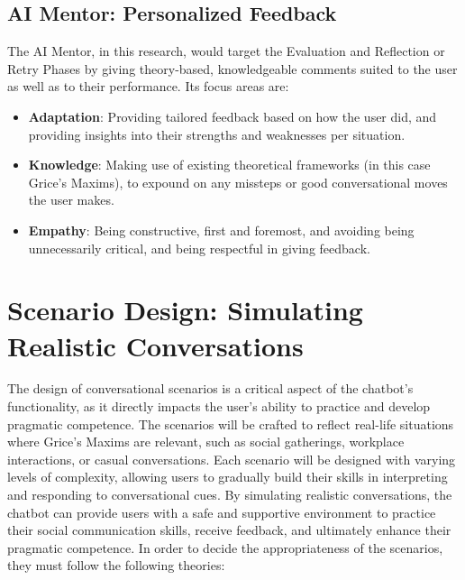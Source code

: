 \subsection{AI Mentor: Personalized Feedback}

The AI Mentor, in this research, would target the Evaluation and Reflection or Retry Phases by giving theory-based, knowledgeable comments suited to the user as well as to their performance. Its focus areas are:

\begin{itemize}
    \item \textbf{Adaptation}: Providing tailored feedback based on how the user did, and providing insights into their strengths and weaknesses per situation.
    \item \textbf{Knowledge}: Making use of existing theoretical frameworks (in this case Grice's Maxims), to expound on any missteps or good conversational moves the user makes.
    \item \textbf{Empathy}: Being constructive, first and foremost, and avoiding being unnecessarily critical, and being respectful in giving feedback.
\end{itemize}

\section{Scenario Design: Simulating Realistic Conversations}
The design of conversational scenarios is a critical aspect of the chatbot's functionality, as it directly impacts the user's ability to practice and develop pragmatic 
competence. The scenarios will be crafted to reflect real-life situations where Grice's Maxims are relevant, such as social gatherings, workplace interactions, 
or casual conversations. Each scenario will be designed with varying levels of complexity, allowing users to gradually build their skills in interpreting and responding to 
conversational cues. By simulating realistic conversations, the chatbot can provide users with a safe and supportive environment to practice their social communication skills, 
receive feedback, and ultimately enhance their pragmatic competence. In order to decide the appropriateness of the scenarios, they must follow the following theories:

